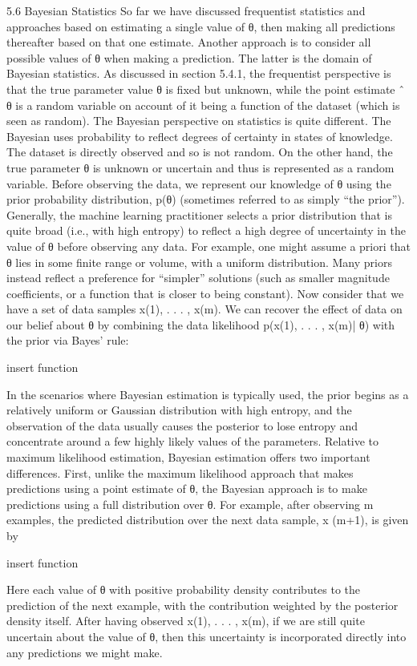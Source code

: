 \documentclass[11pt]{article}
\begin{document}
5.6 Bayesian Statistics
So far we have discussed frequentist statistics and approaches based on estimating a single value of θ, then making all predictions thereafter based on that one estimate.
Another approach is to consider all possible values of θ when making a prediction.
The latter is the domain of Bayesian statistics.
As discussed in section 5.4.1, the frequentist perspective is that the true parameter value θ is ﬁxed but unknown, while the point estimate ˆ θ is a random variable on account of it being a function of the dataset (which is seen as random).
The Bayesian perspective on statistics is quite diﬀerent.
The Bayesian uses probability to reﬂect degrees of certainty in states of knowledge.
The dataset is directly observed and so is not random.
On the other hand, the true parameter θ is unknown or uncertain and thus is represented as a random variable.
Before observing the data, we represent our knowledge of θ using the prior probability distribution, p(θ) (sometimes referred to as simply “the prior”).
Generally, the machine learning practitioner selects a prior distribution that is quite broad (i.e., with high entropy) to reﬂect a high degree of uncertainty in the value of θ before observing any data.
For example, one might assume a priori that θ lies in some ﬁnite range or volume, with a uniform distribution.
Many priors instead reﬂect a preference for “simpler” solutions (such as smaller magnitude coeﬃcients, or a function that is closer to being constant).
Now consider that we have a set of data samples {x(1), . . . , x(m)}.
We can recover the eﬀect of data on our belief about θ by combining the data likelihood p(x(1), . . . , x(m)| θ) with the prior via Bayes’ rule:

    insert function

In the scenarios where Bayesian estimation is typically used, the prior begins as a relatively uniform or Gaussian distribution with high entropy, and the observation of the data usually causes the posterior to lose entropy and concentrate around a few highly likely values of the parameters.
Relative to maximum likelihood estimation, Bayesian estimation oﬀers two important diﬀerences.
First, unlike the maximum likelihood approach that makes predictions using a point estimate of θ, the Bayesian approach is to make predictions
using a full distribution over θ.
For example, after observing m examples, the predicted distribution over the next data sample, x
(m+1), is given by

    insert function

Here each value of θ with positive probability density contributes to the prediction of the next example, with the contribution weighted by the posterior density itself.
After having observed {x(1), . . . , x(m)}, if we are still quite uncertain about the value of θ, then this uncertainty is incorporated directly into any predictions we might make.
\end{document}
